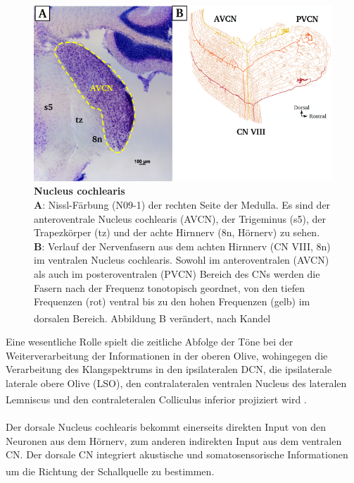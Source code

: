 \documentclass[12pt,a4paper,pdftex]{article}
\begin{document}
\begin{figure}[H]
    \centering
    \includegraphics[width = \textwidth]{pictures/auditory/CN.png}
    \caption[Nucleus cochlearis]{\textbf{Nucleus cochlearis}\\
    \textbf{A}: Nissl-Färbung (N09-1) der rechten Seite der Medulla. Es sind der anteroventrale Nucleus cochlearis (AVCN), der Trigeminus (s5), der Trapezkörper (tz) und der achte Hirnnerv (8n, Hörnerv) zu sehen. \textbf{B}: Verlauf der Nervenfasern aus dem achten Hirnnerv (CN VIII, 8n) im ventralen Nucleus cochlearis. Sowohl im anteroventralen (AVCN) als auch im posteroventralen (PVCN) Bereich des CNs werden die Fasern nach der Frequenz tonotopisch geordnet, von den tiefen Frequenzen (rot) ventral bis zu den hohen Frequenzen (gelb) im dorsalen Bereich. Abbildung B verändert, nach Kandel \textsuperscript{\cite[31]{kandel2013principles}}}
    \label{fig:Nucleus_cochlearis}
\end{figure}

\newpage
Eine wesentliche Rolle spielt die zeitliche Abfolge der Töne bei der Weiterverarbeitung der Informationen in der oberen Olive, wohingegen die Verarbeitung des Klangspektrums in den ipsilateralen DCN, die ipsilaterale laterale obere Olive (LSO), den contralateralen ventralen Nucleus des lateralen Lemniscus und den contraleteralen Colliculus inferior projiziert wird \textsuperscript{\cite[31]{kandel2013principles}}. 
\\\\
\noindent Der dorsale Nucleus cochlearis bekommt einerseits direkten Input von den Neuronen aus dem Hörnerv, zum anderen indirekten Input aus dem ventralen CN. Der dorsale CN integriert akustische und somatosensorische Informationen um die Richtung der Schallquelle zu bestimmen\textsuperscript{\cite[31]{kandel2013principles}}. 
\end{document}
